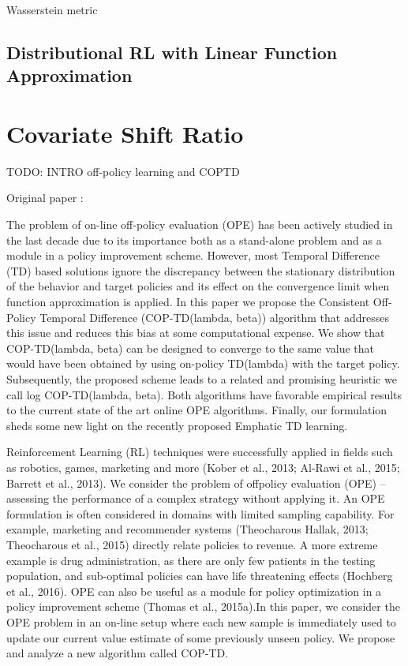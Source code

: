 \documentclass[12pt,a4paper,openright,twoside]{article}
\numberwithin{equation}{section}
\theoremstyle{definition}
\theoremstyle{remark}
\theoremstyle{plain}
\begin{document}
Wasserstein metric



\subsection{Distributional RL with Linear Function Approximation}



\newpage


\thispagestyle{plain}

\thispagestyle{plain}
\section{Covariate Shift Ratio}

TODO: INTRO off-policy learning and COPTD

Original paper \cite{COPTD}:

The problem of on-line off-policy evaluation (OPE) has been actively studied in the last decade due to its importance both as a stand-alone problem and as a module in a policy improvement scheme. However, most Temporal Difference (TD) based solutions ignore the discrepancy between the stationary distribution of the behavior and target policies and its effect on the convergence limit when function approximation is applied. In this paper we propose the Consistent Off-Policy Temporal Difference (COP-TD(lambda, beta)) algorithm that addresses this issue and reduces this bias at some computational expense. We show that COP-TD(lambda, beta) can be designed to converge to the same value that would have been obtained by using on-policy TD(lambda) with the target policy. Subsequently, the proposed scheme leads to a related and promising heuristic we call log COP-TD(lambda, beta). Both algorithms have favorable empirical results to the current state of the art online OPE algorithms. Finally, our formulation sheds some new light on the recently proposed Emphatic TD learning.

Reinforcement Learning (RL) techniques were successfully applied in fields such as robotics, games, marketing and more (Kober et al., 2013; Al-Rawi et al., 2015; Barrett et al., 2013). We consider the problem of offpolicy evaluation (OPE) – assessing the performance of a complex strategy without applying it. An OPE formulation is often considered in domains with limited sampling capability. For example, marketing and recommender systems (Theocharous  Hallak, 2013; Theocharous et al., 2015) directly relate policies to revenue. A more extreme example is drug administration, as there are only few patients in the testing population, and sub-optimal policies can have life threatening effects (Hochberg et al., 2016). OPE can also be useful as a module for policy optimization in a policy improvement scheme (Thomas et al., 2015a).In this paper, we consider the OPE problem in an on-line setup where each new sample is immediately used to update our current value estimate of some previously unseen policy. We propose and analyze a new algorithm called COP-TD.
\end{document}
